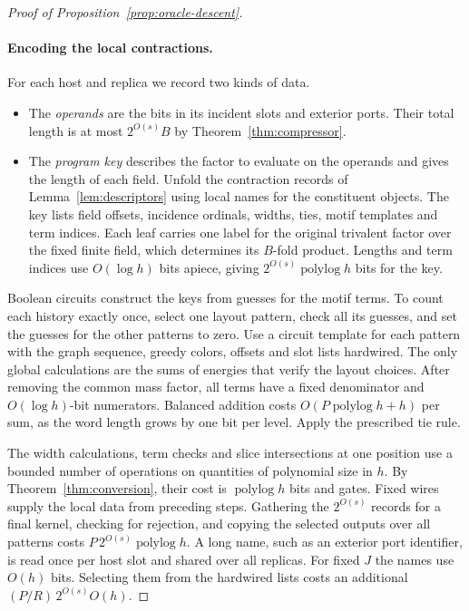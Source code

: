 \begin{proof}[Proof of Proposition~\ref{prop:oracle-descent}]
\paragraph{Encoding the local contractions.}
For each host and replica we record two kinds of data.
\begin{itemize}
\item The \emph{operands} are the bits in its incident slots and exterior
ports. Their total length is at most $2^{O(s)}B$ by
Theorem~\ref{thm:compressor}.
\item The \emph{program key} describes the factor to evaluate on the
operands and gives the length of each field. Unfold the contraction
records of Lemma~\ref{lem:descriptors} using local names for the
constituent objects. The key lists field offsets, incidence ordinals,
widths, ties, motif templates and term indices. Each leaf carries one
label for the original trivalent factor over the fixed finite field,
which determines its $B$-fold product. Lengths and term indices use
$O(\log h)$ bits apiece, giving $2^{O(s)}\operatorname{polylog} h$
bits for the key.
\end{itemize}

Boolean circuits construct the keys from guesses for the motif terms.
To count each history exactly once, select one layout pattern, check
all its guesses, and set the guesses for the other patterns to zero.
Use a circuit template for each pattern with the graph sequence, greedy
colors, offsets and slot lists hardwired. The only global calculations
are the sums of energies that verify the layout choices. After removing
the common mass factor, all terms have a fixed denominator and
$O(\log h)$-bit numerators. Balanced addition costs
$O(P\operatorname{polylog} h+h)$ per sum, as the word length grows by
one bit per level. Apply the prescribed tie rule.

The width calculations, term checks and slice intersections at one
position use a bounded number of operations on quantities of
polynomial size in $h$. By Theorem~\ref{thm:conversion}, their cost is
$\operatorname{polylog} h$ bits and gates. Fixed wires supply the
local data from preceding steps. Gathering the $2^{O(s)}$ records for
a final kernel, checking for rejection, and copying the selected
outputs over all patterns costs $P\,2^{O(s)}\operatorname{polylog} h$.
A long name, such as an exterior port identifier, is read once per
host slot and shared over all replicas. For fixed $J$ the names use
$O(h)$ bits. Selecting them from the hardwired lists costs an additional
$(P/R)\,2^{O(s)}O(h)$.


\end{proof}
